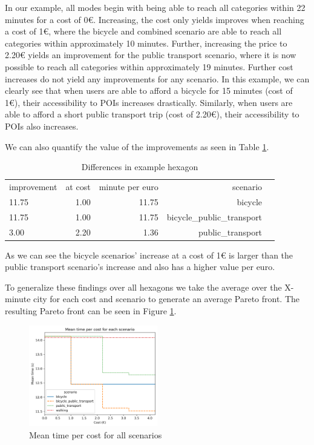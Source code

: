 In our example, all modes begin with being able to reach all categories within 22 minutes for a cost of 0€.
Increasing, the cost only yields improves when reaching a cost of 1€, where the bicycle and combined scenario are able to reach all categories within approximately 10 minutes.
Further, increasing the price to 2.20€ yields an improvement for the public transport scenario, where it is now possible to reach all categories within approximately 19 minutes.
Further cost increases do not yield any improvements for any scenario.
In this example, we can clearly see that when users are able to afford a bicycle for 15 minutes (cost of 1€), their accessibility to POIs increases drastically.
Similarly, when users are able to afford a short public transport trip (cost of 2.20€), their accessibility to POIs also increases.

We can also quantify the value of the improvements as seen in Table \ref{tab:differences_in_example_hexagon}.

\begin{table}
  \caption{Differences in example hexagon}
  \label{tab:differences_in_example_hexagon}
  \begin{center}
    \begin{tabular}{lrrrl}
    improvement & at cost & minute per euro & scenario \\
    11.75 & 1.00 & 11.75 & bicycle \\
    11.75 & 1.00 & 11.75 & bicycle_public_transport \\
    3.00 & 2.20 & 1.36 & public_transport \\
    \end{tabular}
  \end{center}
\end{table}

As we can see the bicycle scenarios' increase at a cost of 1€ is larger than the public transport scenario's increase and also has a higher value per euro.


To generalize these findings over all hexagons we take the average over the X-minute city for each cost and scenario to generate an average Pareto front.
The resulting Pareto front can be seen in Figure \ref{fig:mean_time_per_cost}.

\begin{figure}
  \begin{center}
     \includegraphics[width=0.5\textwidth]{Figures/results/metric_cost/mean_time_per_cost}
  \end{center}
  \caption{Mean time per cost for all scenarios}
  \label{fig:mean_time_per_cost}
\end{figure}

